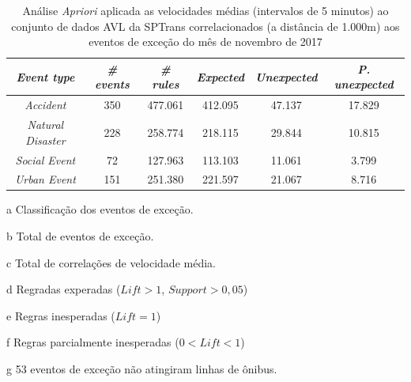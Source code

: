 \documentclass[
	12pt,				%
	oneside,			%
	a4paper,			%
	english,			%
	brazil				%
	]{abntex2ppgsi}
\begin{document}
{{\begin{apendicesenv}
\begin{table}[!htb]
\centering
\begin{threeparttable}
\caption {Análise \textit{Apriori} aplicada as velocidades médias (intervalos de 5 minutos) ao conjunto de dados AVL da SPTrans correlacionados (a distância de 1.000m) aos eventos de exceção do mês de novembro de 2017}
\label {tab:aprioriFull}
\begin{tabular}{c|c|c|c|c|c}
\hline
\textbf{\textit{Event type}}\tnote{a} & \textbf{\textit{\# events}}\tnote{b} & \textit{\textbf{\# rules}}\tnote{c} & \textbf{\textit{Expected}}\tnote{d} & \textbf{\textit{Unexpected}}\tnote{e} & \textbf{\textit{P. unexpected}}\tnote{f}   \\
\hline
\textit{Accident} & 350 & 477.061 & 412.095 & 47.137 & 17.829 \\
\textit{Natural Disaster} & 228 & 258.774 & 218.115 & 29.844 & 10.815 \\
\textit{Social Event} & 72 & 127.963 & 113.103 & 11.061 & 3.799 \\
\textit{Urban Event} & 151 & 251.380 & 221.597 & 21.067 & 8.716 \\
\hline
\end{tabular}
\begin{tablenotes}
            \item[a] Classificação dos eventos de exceção.
            \item[b] Total de eventos de exceção.
            \item[c] Total de correlações de velocidade média.
            \item[d] Regradas experadas ($Lift > 1$, $Support > 0,05$)
            \item[e] Regras inesperadas ($Lift = 1$)
            \item[f] Regras parcialmente inesperadas ($0 < Lift < 1$)
            \item[g] 53 eventos de exceção não atingiram linhas de ônibus.
        \end{tablenotes}
\end{threeparttable}
\end{table}


\end{apendicesenv}}}
\end{document}
